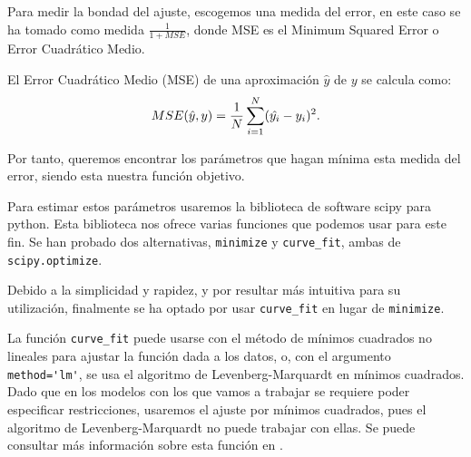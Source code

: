 Para medir la bondad del ajuste, escogemos una medida del error, en este caso se ha tomado como medida $\frac{1}{1+MSE}$, donde MSE es el Minimum Squared Error o Error Cuadrático Medio.

\begin{definition}
El Error Cuadrático Medio (MSE) de una aproximación $\hat{y}$ de $y$ se calcula como:
$$MSE(\hat{y}, y)= {1\over N}\sum_{i=1}^N (\hat{y_i}-y_i)^2.$$
\end{definition}

Por tanto, queremos encontrar los parámetros que hagan mínima esta medida del error, siendo esta nuestra función objetivo.

Para estimar estos parámetros usaremos la biblioteca de software scipy para python. Esta biblioteca nos ofrece varias funciones que podemos usar para este fin. Se han probado dos alternativas, \verb|minimize| y \verb|curve_fit|, ambas de \verb|scipy.optimize|.

Debido a la simplicidad y rapidez, y por resultar más intuitiva para su utilización, finalmente se ha optado por usar \verb|curve_fit| en lugar de \verb|minimize|.

La función \verb|curve_fit| puede usarse con el método de mínimos cuadrados no lineales para ajustar la función dada a los datos, o, con el argumento \verb|method='lm'|, se usa el algoritmo de Levenberg-Marquardt en mínimos cuadrados. Dado que en los modelos con los que vamos a trabajar se requiere poder especificar restricciones, usaremos el ajuste por mínimos cuadrados, pues el algoritmo de Levenberg-Marquardt no puede trabajar con ellas. Se puede consultar más información sobre esta función en \cite{scipy_curvefit}.










